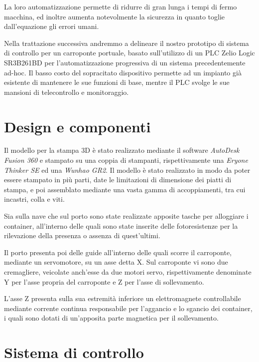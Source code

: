 La loro automatizzazione permette di ridurre di gran lunga i tempi di fermo macchina, ed inoltre
aumenta notevolmente la sicurezza in quanto toglie dall'equazione gli errori umani.
\cite{gupta2004simplified}

Nella trattazione successiva andremmo a delineare il nostro prototipo di sistema di
controllo per un carroponte portuale, basato sull'utilizzo di un PLC Zelio Logic SR3B261BD per
l'automatizzazione progressiva di un sistema precedentemente ad-hoc. Il basso costo del sopracitato
dispositivo permette ad un impianto già esistente di mantenere le sue funzioni di base, mentre il
PLC svolge le sue mansioni di telecontrollo e monitoraggio.


\section{Design e componenti}

Il modello per la stampa 3D è stato realizzato mediante il software \emph{AutoDesk Fusion 360} e
stampato su una coppia di stampanti, rispettivamente una \emph{Eryone Thinker SE} ed una
\emph{Wunhao GR2}. Il modello è stato realizzato in modo da poter essere stampato in più parti, date
le limitazioni di dimensione dei piatti di stampa, e poi assemblato mediante una vasta gamma di
accoppiamenti, tra cui incastri, colla e viti.

Sia sulla nave che sul porto sono state realizzate apposite tasche per alloggiare i container,
all'interno delle quali sono state inserite delle fotoresistenze per la rilevazione della presenza o
assenza di quest'ultimi.

Il porto presenta poi delle guide all'interno delle quali scorre il carroponte, mediante un
servomotore, su un asse detta X. Sul carroponte vi sono due cremagliere, veicolate anch'esse da due
motori servo, rispettivamente denominate Y per l'asse propria del carroponte e Z per l'asse di
sollevamento.

L'asse Z presenta sulla sua estremità inferiore un elettromagnete controllabile mediante corrente
continua responsabile per l'aggancio e lo sgancio dei container, i quali sono dotati di un'apposita
parte magnetica per il sollevamento.

\section{Sistema di controllo}


